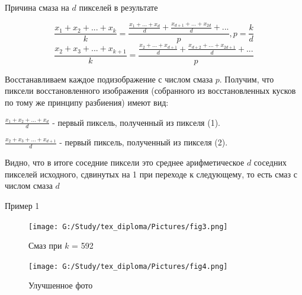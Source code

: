 \documentclass[10pt]{beamer}
\begin{document}
\begin{frame}

\begin{block}{Причина смаза на $d$ пикселей в результате}


\begin{equation}\label{1}
\frac{x_1 + x_2 + ... + x_k}{k} = \frac{\frac{x_1 + ... + x_d}{d} + \frac{x_{d+1} + ... + x_{2d}}{d} + ...}{p}, p = \frac{k}{d}
\end{equation}
\begin{equation}\label{2}
\frac{x_2 + x_3 + ... + x_{k+1}}{k} = \frac{\frac{x_2 + ... + x_{d+1}}{d} + \frac{x_{d+2} + ... + x_{2d+1}}{d} + ...}{p}
\end{equation}

Восстанавливаем каждое подизображение с числом смаза $p$. Получим, что пиксели восстановленного изображения (собранного из восстановленных кусков по тому же принципу разбиения) имеют вид:


{\Large$\frac{x_1 + x_2 + ... + x_d}{d}$} - первый пиксель, полученный из пикселя (1).


{\Large$\frac{x_2 + x_3 + ... + x_{d+1}}{d}$} - первый пиксель, полученный из пикселя (2).


Видно, что в итоге соседние пиксели это среднее арифметическое $d$ соседних пикселей исходного, сдвинутых на 1 при переходе к следующему, то есть смаз с числом смаза $d$

\end{block}

\end{frame}

\begin{frame}
\begin{block}{Пример 1}
\begin{minipage}{50mm}
    \begin{figure}[H]
            \texttt{[image: G:/Study/tex\_diploma/Pictures/fig3.png]}
            \label{Fig3}
            \caption[Смаз при $k$ = 592]{Смаз при $k$ = 592}
        \end{figure}
\end{minipage}
\hspace{5mm}
\begin{minipage}{50mm}
  \begin{figure}[H]
            \texttt{[image: G:/Study/tex\_diploma/Pictures/fig4.png]}
            \label{Fig4}
            \caption[Улучшенное фото]{Улучшенное фото}
        \end{figure}
\end{minipage}
\hfill
\end{block}

\end{frame}
\end{document}
